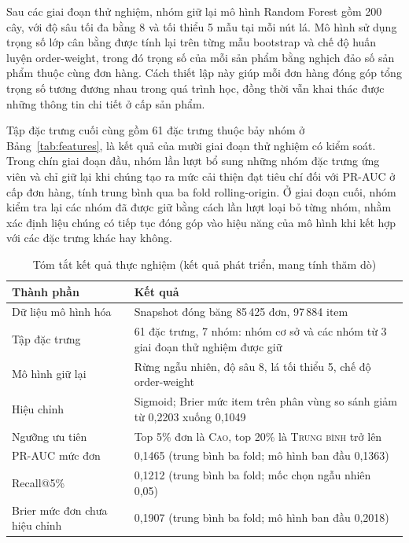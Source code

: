 \documentclass[12pt,a4paper]{report}
\begin{document}
Sau các giai đoạn thử nghiệm, nhóm giữ lại mô hình Random Forest gồm 200 cây, với độ sâu tối đa bằng 8 và tối thiểu 5 mẫu tại mỗi nút lá. Mô hình sử dụng trọng số lớp cân bằng được tính lại trên từng mẫu bootstrap và chế độ huấn luyện order-weight, trong đó trọng số của mỗi sản phẩm bằng nghịch đảo số sản phẩm thuộc cùng đơn hàng. Cách thiết lập này giúp mỗi đơn hàng đóng góp tổng trọng số tương đương nhau trong quá trình học, đồng thời vẫn khai thác được những thông tin chi tiết ở cấp sản phẩm.

Tập đặc trưng cuối cùng gồm 61 đặc trưng thuộc bảy nhóm ở Bảng~\ref{tab:features}, là kết quả của mười giai đoạn thử nghiệm có kiểm soát. Trong chín giai đoạn đầu, nhóm lần lượt bổ sung những nhóm đặc trưng ứng viên và chỉ giữ lại khi chúng tạo ra mức cải thiện đạt tiêu chí đối với PR-AUC ở cấp đơn hàng, tính trung bình qua ba fold rolling-origin. Ở giai đoạn cuối, nhóm kiểm tra lại các nhóm đã được giữ bằng cách lần lượt loại bỏ từng nhóm, nhằm xác định liệu chúng có tiếp tục đóng góp vào hiệu năng của mô hình khi kết hợp với các đặc trưng khác hay không.

\begin{table}[htbp]\centering\small
\caption{Tóm tắt kết quả thực nghiệm (kết quả phát triển, mang tính thăm dò)}\label{tab:res-summary}
\begin{tabular}{L{3.6cm}L{9.9cm}}
\toprule
Thành phần & Kết quả \\
\midrule
Dữ liệu mô hình hóa & Snapshot đóng băng 85\,425 đơn, 97\,884 item \\
Tập đặc trưng & 61 đặc trưng, 7 nhóm: nhóm cơ sở và các nhóm từ 3 giai đoạn thử nghiệm được giữ \\
Mô hình giữ lại & Rừng ngẫu nhiên, độ sâu 8, lá tối thiểu 5, chế độ order-weight \\
Hiệu chỉnh & Sigmoid; Brier mức item trên phân vùng so sánh giảm từ 0,2203 xuống 0,1049 \\
Ngưỡng ưu tiên & Top 5\% đơn là \textsc{Cao}, top 20\% là \textsc{Trung bình} trở lên \\
PR-AUC mức đơn & 0,1465 (trung bình ba fold; mô hình ban đầu 0,1363) \\
Recall@5\% & 0,1212 (trung bình ba fold; mốc chọn ngẫu nhiên 0,05) \\
Brier mức đơn chưa hiệu chỉnh & 0,1907 (trung bình ba fold; mô hình ban đầu 0,2018) \\
\bottomrule
\end{tabular}
\end{table}
\end{document}
